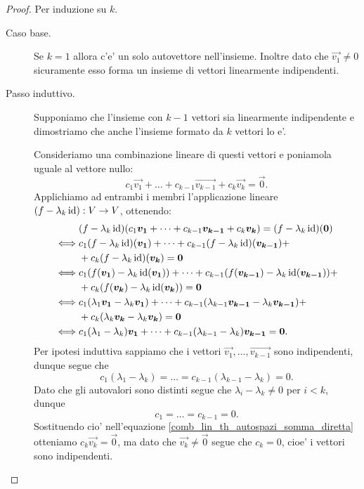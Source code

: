 \begin{proof}
    Per induzione su $k$.
    \begin{description}
        \item[Caso base.] Se $k = 1$ allora c'e' un solo autovettore nell'insieme. Inoltre dato che $\vec{v_1} \neq 0$ sicuramente esso forma un insieme di vettori linearmente indipendenti.
        \item[Passo induttivo.] Supponiamo che l'insieme con $k-1$ vettori sia linearmente indipendente e dimostriamo che anche l'insieme formato da $k$ vettori lo e'.
        
        Consideriamo una combinazione lineare di questi vettori e poniamola uguale al vettore nullo: \begin{equation} \label{comb_lin_th_autospazi_somma_diretta}
            c_1\vec{v_1} + \dots + c_{k-1}\vec{v_{k-1}} + c_k\vec{v_k} = \vec 0.
        \end{equation}
        Applichiamo ad entrambi i membri l'applicazione lineare $(f - \lambda_k\operatorname{id}) : V \to V$, ottenendo:
        \begin{alignat*}
            {1}
            &(f - \lambda_k\operatorname{id})(c_1\bm{v_1} + \dots + c_{k-1}\bm{v_{k-1}} + c_k\bm{v_k}) = (f - \lambda_k\operatorname{id})(\bm{0})\\
            \iff &c_1(f - \lambda_k\operatorname{id})(\bm{v_1}) + \dots + c_{k-1}(f - \lambda_k\operatorname{id})(\bm{v_{k-1}}) +\\
                 &+ c_k(f - \lambda_k\operatorname{id})(\bm{v_k}) = \bm{0} \\
            \iff &c_1(f(\bm{v_1}) - \lambda_k\operatorname{id}(\bm{v_1})) + \dots + c_{k-1}(f(\bm{v_{k-1}}) - \lambda_k\operatorname{id}(\bm{v_{k-1}})) +\\
                 &+ c_k(f(\bm{v_k}) - \lambda_k\operatorname{id}(\bm{v_k})) = \bm{0} \\
            \iff &c_1(\lambda_1\bm{v_1} - \lambda_k\bm{v_1}) + \dots + c_{k-1}(\lambda_{k-1}\bm{v_{k-1}} - \lambda_k\bm{v_{k-1}}) + \\
                 &+ c_k(\lambda_k\bm{v_k} - \lambda_k\bm{v_k}) = \bm{0}\\
            \iff &c_1(\lambda_1 - \lambda_k)\bm{v_1} + \dots + c_{k-1}(\lambda_{k-1} - \lambda_k)\bm{v_{k-1}} = \bm{0}.
        \end{alignat*}
        Per ipotesi induttiva sappiamo che i vettori $\vec{v_1}, \dots, \vec{v_{k-1}}$ sono indipendenti, dunque segue che \[
            c_1(\lambda_1 - \lambda_k) = \dots = c_{k-1}(\lambda_{k-1} - \lambda_k) = 0.
        \]
        Dato che gli autovalori sono distinti segue che $\lambda_i - \lambda_k \neq 0$ per $i < k$, dunque \[
            c_1 = \dots = c_{k-1} = 0.    
        \]
        Sostituendo cio' nell'equazione \ref{comb_lin_th_autospazi_somma_diretta} otteniamo $c_k\vec{v_k} = \vec 0$, ma dato che $\vec{v_k} \neq \vec{0}$ segue che $c_k = 0$, cioe' i vettori sono indipendenti. \qedhere
    \end{description}
\end{proof}


